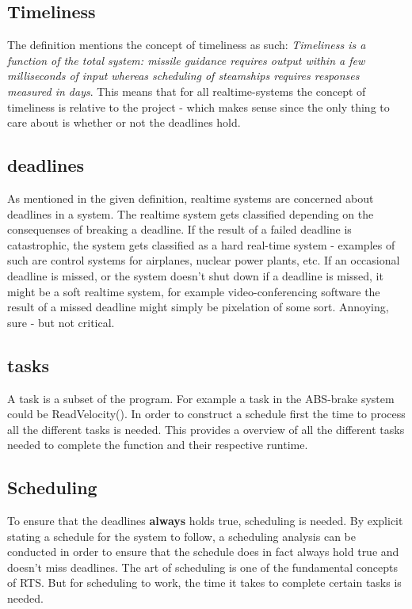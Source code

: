 \subsection{Timeliness}
The definition mentions the concept of timeliness as such: \textit{Timeliness
is a function of the total system: missile guidance requires output within a
few milliseconds of input whereas scheduling of steamships requires responses measured in days}. This means that for all realtime-systems the
concept of timeliness is relative to the project - which makes sense since the only thing to care about is whether or not the deadlines hold.
\subsection{deadlines}
As mentioned in the given definition, realtime systems are concerned about deadlines in a system.
The realtime system gets classified depending on the consequenses of breaking a deadline. If the result of a failed deadline
is catastrophic, the system gets classified as a hard real-time system - examples of such are control systems for airplanes, nuclear power plants, etc.
If an occasional deadline is missed, or the system doesn't shut down if a deadline is missed, it might be a soft realtime system, for example video-conferencing software
the result of a missed deadline might simply be pixelation of some sort. Annoying, sure - but not critical.
\subsection{tasks}
A task is a subset of the program. For example a task in the ABS-brake system could be ReadVelocity(). In order to construct a schedule first
the time to process all the different tasks is needed. This provides a overview of all the different tasks needed to complete the function and their
respective runtime.
\subsection{Scheduling}
To ensure that the deadlines \textbf{always} holds true, scheduling is needed.
By explicit stating a schedule for the system to follow, a scheduling analysis can be conducted in order to ensure that the schedule does in fact always hold true and doesn't miss deadlines. The art of scheduling
is one of the fundamental concepts of RTS. But for scheduling to work, the time it takes to complete certain tasks is needed.
